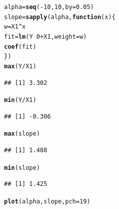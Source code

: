\documentclass[xcolor=dvipsnames]{beamer}\usepackage{graphicx, color}
\makeatletter
\newcommand{\hlfunctioncall}[1]{\textcolor[rgb]{0.501960784313725,0,0.329411764705882}{\textbf{#1}}}%
\newenvironment{kframe}{%
 \def\at@end@of@kframe{}%
 \ifinner\ifhmode%
  \def\at@end@of@kframe{\end{minipage}}%
  \begin{minipage}{\columnwidth}%
 \fi\fi%
 \def\FrameCommand##1{\hskip\@totalleftmargin \hskip-\fboxsep
 \colorbox{shadecolor}{##1}\hskip-\fboxsep
     \hskip-\linewidth \hskip-\@totalleftmargin \hskip\columnwidth}%
 \MakeFramed {\advance\hsize-\width
   \@totalleftmargin\z@ \linewidth\hsize
   \@setminipage}}%
 {\par\unskip\endMakeFramed%
 \at@end@of@kframe}
\newenvironment{knitrout}{}{} %
\makeatother
\begin{document}
\begin{frame}[fragile]
\begin{knitrout}
\color{fgcolor}\begin{kframe}
\begin{alltt}
alpha = \hlfunctioncall{seq}(-10, 10, by = 0.05)
slope = \hlfunctioncall{sapply}(alpha, \hlfunctioncall{function}(x) \{
    w = X1^x
    fit = \hlfunctioncall{lm}(Y ~ 0 + X1, weight = w)
    \hlfunctioncall{coef}(fit)
\})
\hlfunctioncall{max}(Y/X1)
\end{alltt}
\begin{verbatim}
## [1] 3.302
\end{verbatim}
\begin{alltt}
\hlfunctioncall{min}(Y/X1)
\end{alltt}
\begin{verbatim}
## [1] -0.306
\end{verbatim}
\begin{alltt}
\hlfunctioncall{max}(slope)
\end{alltt}
\begin{verbatim}
## [1] 1.488
\end{verbatim}
\begin{alltt}
\hlfunctioncall{min}(slope)
\end{alltt}
\begin{verbatim}
## [1] 1.425
\end{verbatim}
\end{kframe}
\end{knitrout}

\begin{knitrout}
\color{fgcolor}\begin{kframe}
\begin{alltt}
\hlfunctioncall{plot}(alpha, slope, pch = 19)
\end{alltt}
\end{kframe}
\end{knitrout}

\end{frame}
\end{document}
